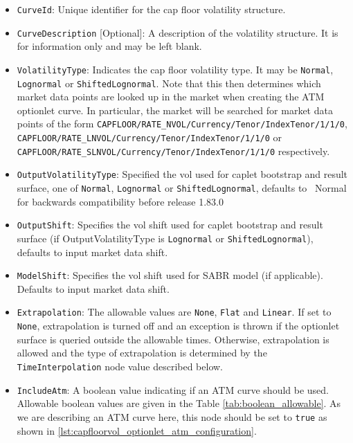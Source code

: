 \begin{itemize}
\item
\lstinline!CurveId!: Unique identifier for the cap floor volatility structure.

\item \lstinline!CurveDescription! [Optional]:
A description of the volatility structure. It is for information only and may be left blank.

\item \lstinline!VolatilityType!:
Indicates the cap floor volatility type. It may be \lstinline!Normal!, \lstinline!Lognormal! or \lstinline!ShiftedLognormal!. Note that this then determines which market data points are looked up in the market when creating the ATM optionlet curve. In particular, the market will be searched for market data points of the form \lstinline!CAPFLOOR/RATE_NVOL/Currency/Tenor/IndexTenor/1/1/0!, \lstinline!CAPFLOOR/RATE_LNVOL/Currency/Tenor/IndexTenor/1/1/0! or \lstinline!CAPFLOOR/RATE_SLNVOL/Currency/Tenor/IndexTenor/1/1/0! respectively.

\item \lstinline!OutputVolatilityType!: Specified the vol used for caplet bootstrap and result surface, one of {\tt Normal},
  {\tt Lognormal} or {\tt ShiftedLognormal}, defaults to {\ Normal} for backwards compatibility before release 1.83.0

\item \lstinline!OutputShift!: Specifies the vol shift used for caplet bootstrap and result surface (if OutputVolatilityType is
{\tt Lognormal} or {\tt ShiftedLognormal}), defaults to input market data shift.

\item \lstinline!ModelShift!: Specifies the vol shift used for SABR model (if applicable). Defaults to input market data shift.

\item \lstinline!Extrapolation!:
The allowable values are \lstinline!None!, \lstinline!Flat! and \lstinline!Linear!. If set to \lstinline!None!, extrapolation is turned off and an exception is thrown if the optionlet surface is queried outside the allowable times. Otherwise, extrapolation is allowed and the type of extrapolation is determined by the \lstinline!TimeInterpolation! node value described below.

\item \lstinline!IncludeAtm!:
A boolean value indicating if an ATM curve should be used. Allowable boolean values are given in the Table \ref{tab:boolean_allowable}. As we are describing an ATM curve here, this node should be set to \lstinline!true! as shown in \ref{lst:capfloorvol_optionlet_atm_configuration}.


\end{itemize}
